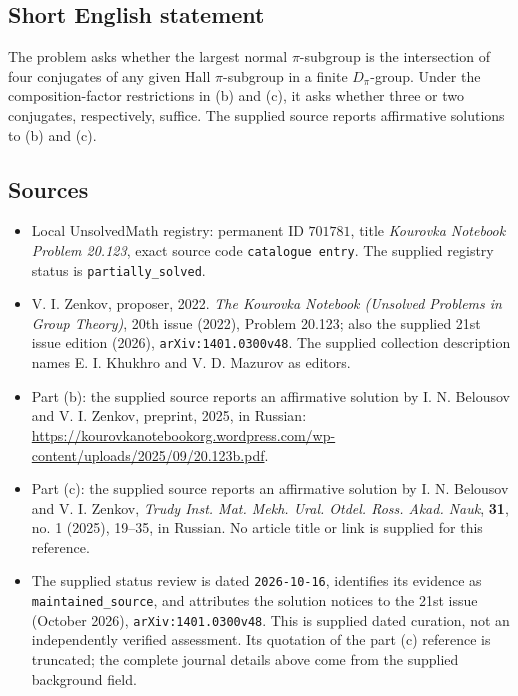 \documentclass[11pt]{article}
\begin{document}
\subsection{Short English statement}
The problem asks whether the largest normal \(\pi\)-subgroup is the intersection of four conjugates of any given Hall \(\pi\)-subgroup in a finite \(D_{\pi}\)-group. Under the composition-factor restrictions in (b) and (c), it asks whether three or two conjugates, respectively, suffice. The supplied source reports affirmative solutions to (b) and (c).
\subsection{Sources}
\begin{itemize}
\item Local UnsolvedMath registry: permanent ID \(701781\), title \emph{Kourovka Notebook Problem 20.123}, exact source code \texttt{catalogue entry}. The supplied registry status is \texttt{partially\_solved}.
\item V. I. Zenkov, proposer, 2022. \emph{The Kourovka Notebook (Unsolved Problems in Group Theory)}, 20th issue (2022), Problem 20.123; also the supplied 21st issue edition (2026), \texttt{arXiv:1401.0300v48}. The supplied collection description names E. I. Khukhro and V. D. Mazurov as editors.
\item Part (b): the supplied source reports an affirmative solution by I. N. Belousov and V. I. Zenkov, preprint, 2025, in Russian: \url{https://kourovkanotebookorg.wordpress.com/wp-content/uploads/2025/09/20.123b.pdf}.
\item Part (c): the supplied source reports an affirmative solution by I. N. Belousov and V. I. Zenkov, \emph{Trudy Inst. Mat. Mekh. Ural. Otdel. Ross. Akad. Nauk}, \textbf{31}, no. 1 (2025), 19--35, in Russian. No article title or link is supplied for this reference.
\item The supplied status review is dated \texttt{2026-10-16}, identifies its evidence as \texttt{maintained\_source}, and attributes the solution notices to the 21st issue (October 2026), \texttt{arXiv:1401.0300v48}. This is supplied dated curation, not an independently verified assessment. Its quotation of the part (c) reference is truncated; the complete journal details above come from the supplied background field.
\end{itemize}
\end{document}
